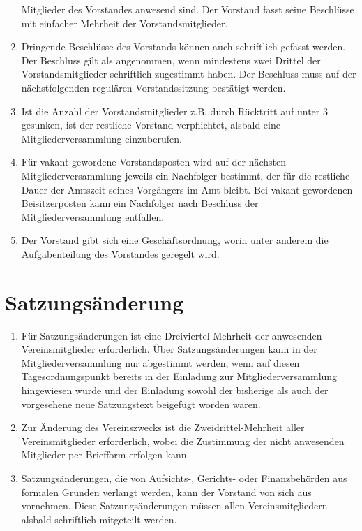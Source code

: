 \documentclass[a4paper,11pt]{scrartcl}
\begin{document}
\begin{enumerate}
    Mitglieder des Vorstandes anwesend sind. Der Vorstand fasst seine Beschlüsse 
    mit einfacher Mehrheit der Vorstandsmitglieder.
  \item Dringende Beschlüsse des Vorstands können auch schriftlich gefasst 
    werden. Der Beschluss gilt als angenommen, wenn mindestens zwei Drittel der 
    Vorstandsmitglieder schriftlich zugestimmt haben. Der Beschluss muss auf der 
    nächstfolgenden regulären Vorstandssitzung bestätigt werden.
  \item Ist die Anzahl der Vorstandsmitglieder z.B. durch Rücktritt auf unter 3 
    gesunken, ist der restliche Vorstand verpflichtet, alsbald eine 
    Mitgliederversammlung einzuberufen.
  \item Für vakant gewordene Vorstandsposten wird auf der nächsten 
    Mitgliederversammlung jeweils ein Nachfolger bestimmt, der für die restliche 
    Dauer der Amtszeit seines Vorgängers im Amt bleibt. Bei vakant gewordenen 
    Beisitzerposten kann ein Nachfolger nach Beschluss der Mitgliederversammlung 
    entfallen.
  \item Der Vorstand gibt sich eine Geschäftsordnung, worin unter anderem die 
    Aufgabenteilung des Vorstandes geregelt wird.
\end{enumerate}

\section{Satzungsänderung}
\begin{enumerate}
  \item Für Satzungsänderungen ist eine Dreiviertel-Mehrheit der anwesenden 
    Vereinsmitglieder erforderlich. Über Satzungsänderungen kann in der 
    Mitgliederversammlung nur abgestimmt werden, wenn auf diesen Tagesordnungspunkt 
    bereits in der Einladung zur Mitgliederversammlung hingewiesen wurde und der 
    Einladung sowohl der bisherige als auch der vorgesehene neue Satzungstext 
    beigefügt worden waren.
  \item Zur Änderung des Vereinszwecks ist die Zweidrittel-Mehrheit aller 
    Vereinsmitglieder erforderlich, wobei die Zustimmung der nicht anwesenden 
    Mitglieder per Briefform erfolgen kann.
  \item Satzungsänderungen, die von Aufsichts-, Gerichts- oder Finanzbehörden 
    aus formalen Gründen verlangt werden, kann der Vorstand von sich aus 
    vornehmen. Diese Satzungsänderungen müssen allen Vereinsmitgliedern alsbald 
    schriftlich mitgeteilt werden.
\end{enumerate}
\end{document}
